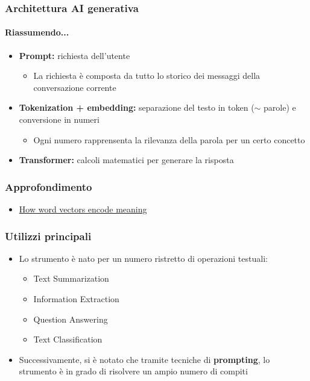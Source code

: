 \begin{contentframe}
    \frametitle{Architettura AI generativa}
    \framesubtitle{Riassumendo...}


    \begin{itemize}
        \item \textbf{Prompt:} richiesta dell'utente
        \begin{itemize}
            \item La richiesta è composta da tutto lo storico dei messaggi della conversazione corrente
        \end{itemize}
        \item \textbf{Tokenization + embedding:} separazione del testo in token ($\sim$ parole) e conversione in numeri
        \begin{itemize}
            \item Ogni numero rapprensenta la rilevanza della parola per un certo concetto
        \end{itemize}
        \item \textbf{Transformer:} calcoli matematici per generare la risposta
    \end{itemize}
\end{contentframe}

\begin{exampleframe}
    \frametitle{Approfondimento}

    \begin{itemize}
        \item \href{https://github.com/DavidePonzini/didattica/raw/refs/heads/main/res/HowWordVectorsEncodeMeaning.mkv}{How word vectors encode meaning \faFileVideo}
    \end{itemize}
\end{exampleframe}

\begin{contentframe}
    \frametitle{Utilizzi principali}

    \begin{itemize}
        \item Lo strumento è nato per un numero ristretto di operazioni testuali:
        \begin{itemize}
            \item Text Summarization
            \item Information Extraction
            \item Question Answering
            \item Text Classification
        \end{itemize}
        
        \bigskip
        \item Successivamente, si è notato che tramite tecniche di \textbf{prompting}, lo strumento è in grado di risolvere un ampio numero di compiti
    \end{itemize}
\end{contentframe}

